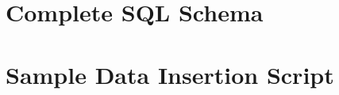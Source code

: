 \documentclass[12pt]{report}
\begin{document}
    \appendix
    \chapter{Complete SQL Schema}
    
    
    \chapter{Sample Data Insertion Script}
    
    
\end{document}
